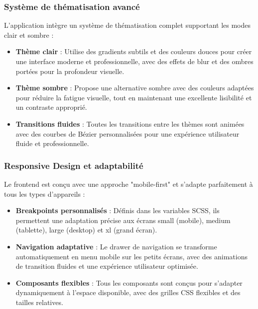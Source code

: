 \documentclass[12pt,a4paper]{report}
\begin{document}
\subsubsection{Système de thématisation avancé}

L'application intègre un système de thématisation complet supportant les modes clair et sombre :

\begin{itemize}
\item \textbf{Thème clair} : Utilise des gradients subtils et des couleurs douces pour créer une interface moderne et professionnelle, avec des effets de blur et des ombres portées pour la profondeur visuelle.

\item \textbf{Thème sombre} : Propose une alternative sombre avec des couleurs adaptées pour réduire la fatigue visuelle, tout en maintenant une excellente lisibilité et un contraste approprié.

\item \textbf{Transitions fluides} : Toutes les transitions entre les thèmes sont animées avec des courbes de Bézier personnalisées pour une expérience utilisateur fluide et professionnelle.
\end{itemize}

\subsubsection{Responsive Design et adaptabilité}

Le frontend est conçu avec une approche "mobile-first" et s'adapte parfaitement à tous les types d'appareils :

\begin{itemize}
\item \textbf{Breakpoints personnalisés} : Définis dans les variables SCSS, ils permettent une adaptation précise aux écrans small (mobile), medium (tablette), large (desktop) et xl (grand écran).

\item \textbf{Navigation adaptative} : Le drawer de navigation se transforme automatiquement en menu mobile sur les petits écrans, avec des animations de transition fluides et une expérience utilisateur optimisée.

\item \textbf{Composants flexibles} : Tous les composants sont conçus pour s'adapter dynamiquement à l'espace disponible, avec des grilles CSS flexibles et des tailles relatives.
\end{itemize}
\end{document}
